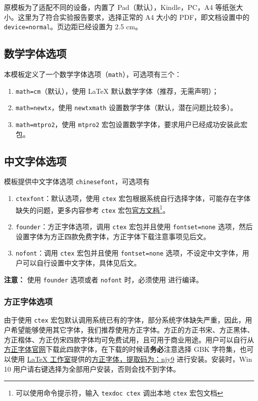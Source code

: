 \documentclass[cn,hazy,pku,12pt,normal,math=newtx,cite=super]{elegantnote}
\begin{document}
原模板为了适配不同的设备，内置了 Pad（默认），Kindle，PC，A4 等纸张大小。这里为了符合实验报告要求，选择正常的 A4 大小的 PDF，即文档设置中的 \lstinline{device=normal}。页边距已经设置为 2.5 \si{cm}。


\subsection{数学字体选项}

本模板定义了一个数学字体选项（\lstinline{math}），可选项有三个：
\begin{enumerate}
  \item \lstinline{math=cm}（默认），使用 \LaTeX{} 默认数学字体（推荐，无需声明）；
  \item \lstinline{math=newtx}，使用 \lstinline{newtxmath} 设置数学字体（默认，潜在问题比较多）。
  \item \lstinline{math=mtpro2}，使用 \lstinline{mtpro2} 宏包设置数学字体，要求用户已经成功安装此宏包。
\end{enumerate}


\subsection{中文字体选项}
模板提供中文字体选项 \lstinline{chinesefont}，可选项有
\begin{enumerate}
\item \lstinline{ctexfont}：默认选项，使用 \lstinline{ctex} 宏包根据系统自行选择字体，可能存在字体缺失的问题，更多内容参考 \lstinline{ctex} 宏包\href{https://ctan.org/pkg/ctex}{官方文档}\footnote{可以使用命令提示符，输入 \lstinline{texdoc ctex} 调出本地 \lstinline{ctex} 宏包文档}。
\item \lstinline{founder}：方正字体选项，调用 \lstinline{ctex} 宏包并且使用 \lstinline{fontset=none} 选项，然后设置字体为方正四款免费字体，方正字体下载注意事项见后文。
\item \lstinline{nofont}：调用 \lstinline{ctex} 宏包并且使用 \lstinline{fontset=none} 选项，不设定中文字体，用户可以自行设置中文字体，具体见后文。
\end{enumerate}

\noindent \textbf{注意：} 使用 \lstinline{founder} 选项或者 \lstinline{nofont} 时，必须使用  进行编译。

\subsubsection{方正字体选项}
由于使用 \lstinline{ctex} 宏包默认调用系统已有的字体，部分系统字体缺失严重，因此，用户希望能够使用其它字体，我们推荐使用方正字体。方正的{\songti 方正书宋}、{\heiti 方正黑体}、{\kaishu 方正楷体}、{\fangsong 方正仿宋}四款字体均可免费试用，且可用于商业用途。用户可以自行从\href{http://www.foundertype.com/}{方正字体官网}下载此四款字体，在下载的时候请\textbf{务必}注意选择 GBK 字符集，也可以使用 \href{https://www.latexstudio.net/}{\LaTeX{} 工作室}提供的\href{https://pan.baidu.com/s/1BgbQM7LoinY7m8yeP25Y7Q}{方正字体，提取码为：njy9} 进行安装。安装时，{\kaishu Win 10 用户请右键选择为全部用户安装，否则会找不到字体。}
\end{document}
